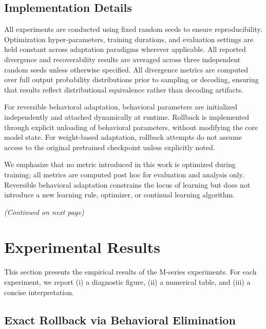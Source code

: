 \documentclass{article}
\begin{document}
	\subsection{Implementation Details}
	\label{sec:implementation_details}
	
	All experiments are conducted using fixed random seeds to ensure reproducibility. Optimization hyper-parameters, training durations, and evaluation settings are held constant across adaptation paradigms wherever applicable. All reported divergence and recoverability results are averaged across three independent random seeds unless otherwise specified. All divergence metrics are computed over full output probability distributions prior to sampling or decoding, ensuring that results reflect distributional equivalence rather than decoding artifacts.
	
	For reversible behavioral adaptation, behavioral parameters are initialized independently and attached dynamically at runtime. Rollback is implemented through explicit unloading of behavioral parameters, without modifying the core model state. For weight-based adaptation, rollback attempts do not assume access to the original pretrained checkpoint unless explicitly noted.
	
	We emphasize that no metric introduced in this work is optimized during training; all metrics are computed post hoc for evaluation and analysis only. Reversible behavioral adaptation constrains the locus of learning but does not introduce a new learning rule, optimizer, or continual learning algorithm.
	
	\vfill
	\begin{center}
		\textit{(Continued on next page)}
	\end{center}
	
	\pagebreak
	
	\section{Experimental Results}
	\label{sec:results}
	
	This section presents the empirical results of the M-series experiments.
	For each experiment, we report (i) a diagnostic figure, (ii) a numerical table,
	and (iii) a concise interpretation.
	
	
	\subsection{Exact Rollback via Behavioral Elimination}
	\label{sec:elim}
	
\end{document}
